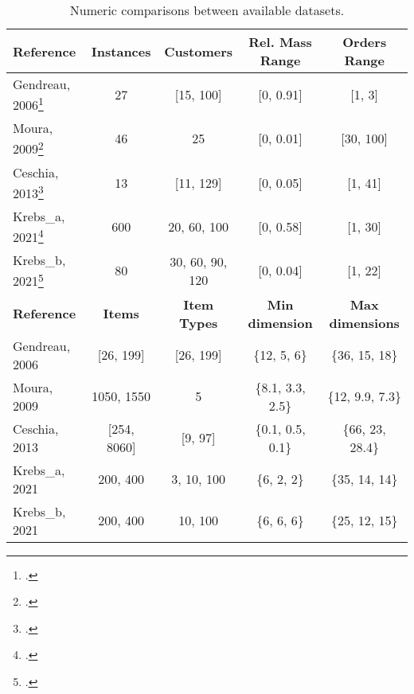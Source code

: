 \begin{table}[!ht]
    \centering
    \small
    \begin{tabular}{@{}lcccc@{}}
        \toprule
        \textbf{Reference}                                  & \textbf{Instances} & \textbf{Customers}  & \textbf{Rel. Mass Range} & \textbf{Orders Range}   \\
        \midrule
        Gendreau, 2006\footcite[cf.][]{gendreau_tabu_2006}  & 27                 & [15, 100]           & [0, 0.91]                & [1, 3]                  \\
        Moura, 2009\footcite[cf.][]{moura_integrated_2009}  & 46                 & 25                  & [0, 0.01]                & [30, 100]               \\
        Ceschia, 2013\footcite[cf.][]{ceschia_local_2013}   & 13                 & [11, 129]           & [0, 0.05]                & [1, 41]                 \\
        Krebs\_a, 2021\footcite[cf.][]{krebs_advanced_2021} & 600                & 20, 60, 100         & [0, 0.58]                & [1, 30]                 \\
        Krebs\_b, 2021\footcite[cf.][]{krebs_axle_2021}     & 80                 & 30, 60, 90, 120     & [0, 0.04]                & [1, 22]                 \\
        \toprule
        \textbf{Reference}                                  & \textbf{Items}     & \textbf{Item Types} & \textbf{Min dimension}   & \textbf{Max dimensions} \\
        \midrule
        Gendreau, 2006                                      & [26, 199]          & [26, 199]           & \{12, 5, 6\}             & \{36, 15, 18\}          \\
        Moura, 2009                                         & 1050, 1550         & 5                   & \{8.1, 3.3, 2.5\}        & \{12, 9.9, 7.3\}        \\
        Ceschia, 2013                                       & [254, 8060]        & [9, 97]             & \{0.1, 0.5, 0.1\}        & \{66, 23, 28.4\}        \\
        Krebs\_a, 2021                                      & 200, 400           & 3, 10, 100          & \{6, 2, 2\}              & \{35, 14, 14\}          \\
        Krebs\_b, 2021                                      & 200, 400           & 10, 100             & \{6, 6, 6\}              & \{25, 12, 15\}          \\
        \bottomrule
    \end{tabular}
    \caption{Numeric comparisons between available datasets.}
    \label{tab:dataset_comparison}
\end{table}
